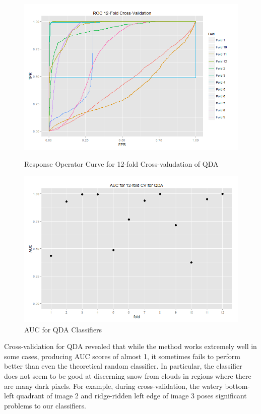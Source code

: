 \documentclass{article}\usepackage[]{graphicx}\usepackage[]{color}
\begin{document}
\begin{figure}[h]
  \includegraphics[width=\linewidth]{QDArocCV.png}
  \caption{Response Operator Curve for 12-fold Cross-valudation of QDA}\label{}
\endminipage\hfill
{}
  \includegraphics[width=\linewidth]{AUCcvQDA.png}
  \caption{AUC for QDA Classifiers}\label{rocauc}
\endminipage\hfill
\end{figure}

Cross-validation for QDA revealed that while the method works extremely well in some cases, producing AUC scores of almost 1, it sometimes fails to perform better than even the theoretical random classifier.  In particular, the classifier does not seem to be good at discerning snow from clouds in regions where there are many dark pixels.  For example, during cross-validation, the watery bottom-left quadrant of image 2 and ridge-ridden left edge of image 3 poses significant problems to our classifiers.
\end{document}
